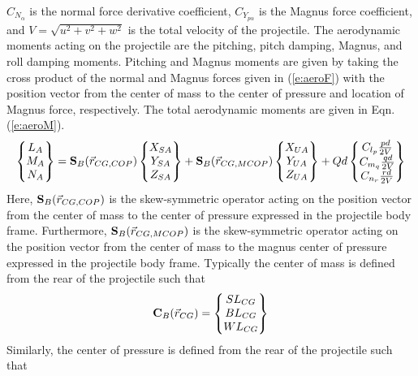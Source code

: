 \documentclass{article}
\begin{document}
$C_{N_\alpha}$ is the normal force derivative coefficient,
$C_{Y_{p\alpha}}$ is the Magnus force coefficient, and
$V=\sqrt{u^2+v^2+w^2}$ is the total velocity of the projectile. 
The aerodynamic moments acting on the projectile are the pitching,
pitch damping, Magnus, and roll damping moments. Pitching and Magnus
moments are given by taking the cross product of the normal and Magnus
forces given in (\ref{e:aeroF})  with the position vector from the
center of mass to the center of pressure and location of Magnus force,
respectively. The total aerodynamic moments are given in
Eqn. (\ref{e:aeroM}). 
\begin{equation}\label{e:aeroM}
\begin{Bmatrix} L_A \\ M_A \\ N_A \end{Bmatrix}=
{\bf S}_B(\vec{r}_{CG,COP})\begin{Bmatrix}
  X_{SA} \\ Y_{SA}\\ Z_{SA} \end{Bmatrix} + {\bf S}_B(\vec{r}_{CG,MCOP})\begin{Bmatrix}
  X_{UA} \\ Y_{UA}\\ Z_{UA} \end{Bmatrix} + 
Qd \begin{Bmatrix}
C_{l_p} \frac{pd}{2V} \\
C_{m_q} \frac{qd}{2V}\\
C_{n_r} \frac{rd}{2V} \end{Bmatrix}
\end{equation}
Here, ${\bf S}_B(\vec{r}_{CG,COP})$ is the skew-symmetric operator
acting on the position vector from the center of mass to the center of
pressure expressed in the projectile body frame. Furthermore, ${\bf S}_B(\vec{r}_{CG,MCOP})$ is the skew-symmetric operator
acting on the position vector from the center of mass to the magnus
center of pressure expressed in the projectile body frame. Typically
the center of mass is defined from the rear of the projectile such
that 
\begin{equation}
{\bf C}_B(\vec{r}_{CG}) = \begin{Bmatrix} SL_{CG} \\ BL_{CG} \\ WL_{CG} \end{Bmatrix}
\end{equation}
Similarly, the center of pressure is defined from the rear of the
projectile such that
\end{document}
